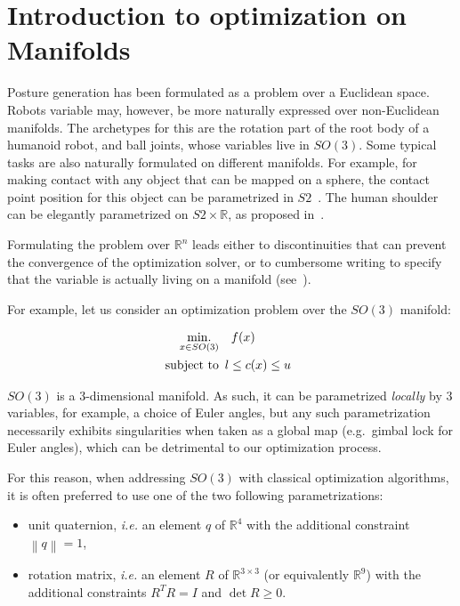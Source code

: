 \section{Introduction to optimization on Manifolds}
\label{sec:introduction_to_optimization_on_manifolds}

Posture generation has been formulated as a problem over a Euclidean space.
Robots variable may, however, be more naturally expressed over non-Euclidean manifolds.
The archetypes for this are the rotation part of the root body of a humanoid robot, and ball joints, whose variables live in $SO(3)$.
Some typical tasks are also naturally formulated on different manifolds.
For example, for making contact with any object that can be mapped on a sphere, the contact point position for this object can be parametrized in $S2$~\cite{escande:icra:2016}.
The human shoulder can be elegantly parametrized on $S2\times\mathbb{R}$, as proposed in~\cite{baerlocher}.

Formulating the problem over $\mathbb{R}^n$ leads either to discontinuities that can prevent the convergence of the optimization solver, or to cumbersome writing to specify that the variable is actually living on a manifold (see~\cite{bouyarmane:humanoids:2012}).

For example, let us consider an optimization problem over the $SO(3)$ manifold:

\begin{align}
\label{eq:pb_on_SO3}
  \operatorname*{min.}_{x \in SO(3)} & \quad f(x)\\
  \text{subject to}&
  \begin{array}{lr}
    l \leq c(x) \leq u \nonumber
  \end{array}
\end{align}

$SO(3)$ is a 3-dimensional manifold.
As such, it can be parametrized \emph{locally} by $3$ variables, for example, a choice of Euler angles, but any such parametrization necessarily exhibits singularities when taken as a global map (e.g.\ gimbal lock for Euler angles), which can be detrimental to our optimization process.

For this reason, when addressing $SO(3)$ with classical optimization algorithms, it is often preferred to use one of the two following parametrizations:
\begin{itemize}
    \item unit quaternion, \emph{i.e.} an element $q$ of $\mathbb{R}^4$ with the additional constraint $\left\|q\right\| = 1$,
    \item rotation matrix, \emph{i.e.} an element $R$ of $\mathbb{R}^{3 \times 3}$ (or equivalently $\mathbb{R}^9$) with the additional constraints $R^T R = I$ and $\det{R} \geq 0$.
\end{itemize}

